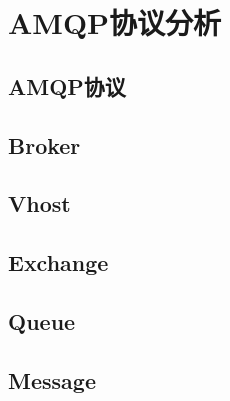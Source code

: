 \chapter{AMQP协议分析}

\section{AMQP协议}

\section{Broker}

\section{Vhost}

\section{Exchange}

\section{Queue}

\section{Message}

